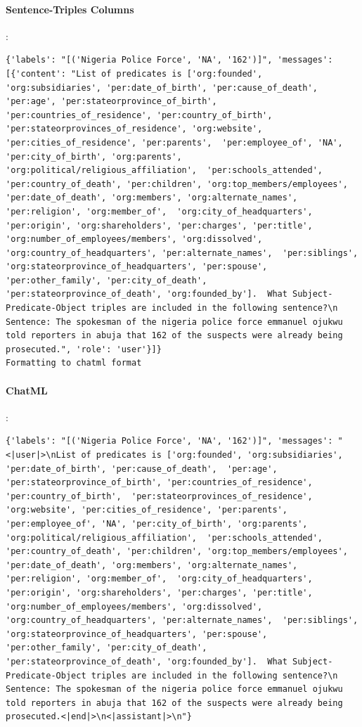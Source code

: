 \documentclass{article}
\begin{document}
\paragraph{Sentence-Triples Columns}:
\begin{lstlisting}
{'labels': "[('Nigeria Police Force', 'NA', '162')]", 'messages': [{'content': "List of predicates is ['org:founded', 'org:subsidiaries', 'per:date_of_birth', 'per:cause_of_death',  'per:age', 'per:stateorprovince_of_birth', 'per:countries_of_residence', 'per:country_of_birth',  'per:stateorprovinces_of_residence', 'org:website', 'per:cities_of_residence', 'per:parents',  'per:employee_of', 'NA', 'per:city_of_birth', 'org:parents', 'org:political/religious_affiliation',  'per:schools_attended', 'per:country_of_death', 'per:children', 'org:top_members/employees',  'per:date_of_death', 'org:members', 'org:alternate_names', 'per:religion', 'org:member_of',  'org:city_of_headquarters', 'per:origin', 'org:shareholders', 'per:charges', 'per:title',  'org:number_of_employees/members', 'org:dissolved', 'org:country_of_headquarters', 'per:alternate_names',  'per:siblings', 'org:stateorprovince_of_headquarters', 'per:spouse', 'per:other_family', 'per:city_of_death',  'per:stateorprovince_of_death', 'org:founded_by'].  What Subject-Predicate-Object triples are included in the following sentence?\n Sentence: The spokesman of the nigeria police force emmanuel ojukwu told reporters in abuja that 162 of the suspects were already being prosecuted.", 'role': 'user'}]}
Formatting to chatml format
\end{lstlisting}
\paragraph{ChatML}:
\begin{lstlisting}
{'labels': "[('Nigeria Police Force', 'NA', '162')]", 'messages': "<|user|>\nList of predicates is ['org:founded', 'org:subsidiaries', 'per:date_of_birth', 'per:cause_of_death',  'per:age', 'per:stateorprovince_of_birth', 'per:countries_of_residence', 'per:country_of_birth',  'per:stateorprovinces_of_residence', 'org:website', 'per:cities_of_residence', 'per:parents',  'per:employee_of', 'NA', 'per:city_of_birth', 'org:parents', 'org:political/religious_affiliation',  'per:schools_attended', 'per:country_of_death', 'per:children', 'org:top_members/employees',  'per:date_of_death', 'org:members', 'org:alternate_names', 'per:religion', 'org:member_of',  'org:city_of_headquarters', 'per:origin', 'org:shareholders', 'per:charges', 'per:title',  'org:number_of_employees/members', 'org:dissolved', 'org:country_of_headquarters', 'per:alternate_names',  'per:siblings', 'org:stateorprovince_of_headquarters', 'per:spouse', 'per:other_family', 'per:city_of_death',  'per:stateorprovince_of_death', 'org:founded_by'].  What Subject-Predicate-Object triples are included in the following sentence?\n Sentence: The spokesman of the nigeria police force emmanuel ojukwu told reporters in abuja that 162 of the suspects were already being prosecuted.<|end|>\n<|assistant|>\n"}
\end{lstlisting}


\end{document}
